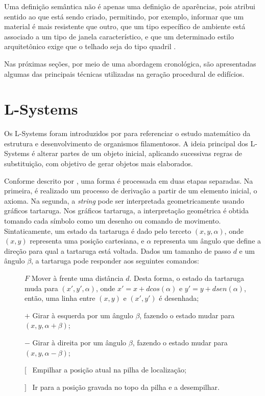 Uma definição semântica não é apenas uma definição de aparências, pois atribui sentido ao que está sendo criado, permitindo, por exemplo, informar que um material é mais resistente que outro, que um tipo específico de ambiente está associado a um tipo de janela característico, e que um determinado estilo arquitetônico exige que o telhado seja do tipo quadril \cite{musse2015}.

Nas próximas seções, por meio de uma abordagem cronológica, são apresentadas algumas das principais técnicas utilizadas na geração procedural de edifícios.

\section{L-Systems}
\label{sec:l_systems}

Os \gls{L-Systems} foram introduzidos por  para referenciar o estudo matemático da estrutura e desenvolvimento de organismos filamentosos. A ideia principal dos \gls{L-Systems} é alterar partes de um objeto inicial, aplicando sucessivas regras de substituição, com objetivo de gerar objetos mais elaborados.

Conforme descrito por , uma forma é processada em duas etapas separadas. Na primeira, é realizado um processo de derivação a partir de um elemento inicial, o axioma. Na segunda, a \textit{string} pode ser interpretada geometricamente usando gráficos tartaruga. Nos gráficos tartaruga, a interpretação geométrica é obtida tomando cada símbolo como um desenho ou comando de movimento. Sintaticamente, um estado da tartaruga é dado pelo terceto $(x, y, \alpha)$, onde $(x, y)$ representa uma posição cartesiana, e $\alpha$ representa um ângulo que define a direção para qual a tartaruga está voltada. Dados um tamanho de passo $d$ e um ângulo $\beta$, a tartaruga pode responder aos seguintes comandos:

\vspace{0.5cm}

\begin{description}
    \item[] $F$ \quad Mover à frente uma distância $d$. Desta forma, o estado da tartaruga muda para $(x', y', \alpha)$, onde $x' = x + d cos(\alpha)$ e $y' = y + d sen(\alpha)$, então, uma linha entre $(x, y)$ e $(x', y')$ é desenhada;
    
    \item[] $+$ \quad Girar à esquerda por um ângulo $\beta$, fazendo o estado mudar para $(x, y, \alpha + \beta)$;
    
    \item[] $-$ \quad Girar à direita por um ângulo $\beta$, fazendo o estado mudar para $(x, y, \alpha - \beta)$;
    
    \item[] $[$ \quad \, Empilhar a posição atual na pilha de localização;
    
    \item[] $]$ \quad \, Ir para a posição gravada no topo da pilha e a desempilhar.
\end{description}

